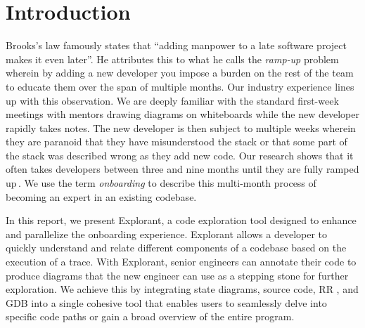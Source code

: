 \chapter{Introduction}





Brooks's law famously states that ``adding manpower to a late software project makes it even later''\cite{onboarding-brooks}. He attributes this to what he calls the \textit{ramp-up} problem\cite{onboarding-ramp} wherein by adding a new developer you impose a burden on the rest of the team to educate them over the span of multiple months. Our industry experience lines up with this observation. We are deeply familiar with the standard first-week meetings with mentors drawing diagrams on whiteboards while the new developer rapidly takes notes. The new developer is then subject to multiple weeks wherein they are paranoid that they have misunderstood the stack or that some part of the stack was described wrong as they add new code. Our research shows that it often takes developers between three and nine months until they are fully ramped up\,\cite{onboarding-time}. We use the term \textit{onboarding} to describe this multi-month process of becoming an expert in an existing codebase.

In this report, we present Explorant, a code exploration tool designed to enhance and parallelize the onboarding experience. Explorant allows a developer to quickly understand and relate different components of a codebase based on the execution of a trace. With Explorant, senior engineers can annotate their code to produce diagrams that the new engineer can use as a stepping stone for further exploration. We achieve this by integrating state diagrams, source code, RR \cite{rr-site}, and GDB \cite{gdb} into a single cohesive tool that enables users to seamlessly delve into specific code paths or gain a broad overview of the entire program.


